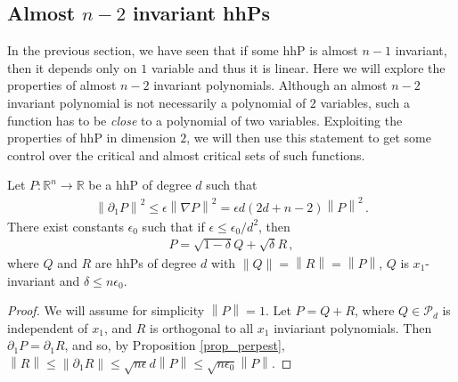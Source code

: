 \documentclass[11pt]{article}
\begin{document}
\subsection[Almost n-2 invariant hhPs]{Almost $n-2$ invariant hhPs}\label{ss:almost_codim2_invariant}
In the previous section, we have seen that if some hhP is almost $n-1$ invariant, then it depends only on $1$ variable and thus it is linear. Here we will explore the properties of almost $n-2$ invariant polynomials. Although an almost $n-2$ invariant polynomial is not necessarily a polynomial of $2$ variables, such a function has to be \textit{close} to a polynomial of two variables. Exploiting the properties of hhP in dimension $2$, we will then use this statement to get some control over the critical and almost critical sets of such functions.

\begin{lemma}
 Let $P:{\mathbb{R}}^n\to {\mathbb{R}}$ be a hhP of degree $d$ such that
 \begin{gather}
  {\left\|{\partial_1 P}\right\|}^2\leq \epsilon {\left\|{\nabla P}\right\|}^2 = \epsilon d(2d+n-2) {\left\|{P}\right\|}^2\, .
 \end{gather}
There exist constants $\epsilon_0$ such that if $\epsilon\leq \epsilon_0/d^2$, then
\begin{gather}
 P = \sqrt{1-\delta} Q + \sqrt \delta R\, ,
\end{gather}
where $Q$ and $R$ are hhPs of degree $d$ with ${\left\|Q\right\|} = {\left\|R\right\|} = {\left\|P\right\|}$, $Q$ is $x_1$-invariant and $\delta\leq n\epsilon_0$.
\end{lemma}
\begin{proof}
 We will assume for simplicity ${\left\|P\right\|}=1$. Let $P=Q+R$, where $Q\in {\mathcal{P}}_d$ is independent of $x_1$, and $R$ is orthogonal to all $x_1$ inviariant polynomials. Then $\partial_1 P = \partial_1 R$, and so, by Proposition \ref{prop_perpest}, ${\left\|{R}\right\|}\leq {\left\|{\partial_1 R}\right\|}\leq \sqrt{n\epsilon} d {\left\|{P}\right\|}\leq \sqrt{n\epsilon_0} {\left\|P\right\|}$.
\end{proof}
\end{document}
